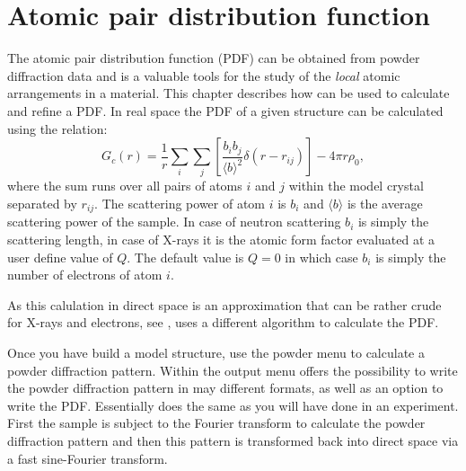 
\chapter{Atomic pair distribution function \label{pdf}}

The atomic pair distribution function (PDF) can be obtained from
powder diffraction data and is a valuable tools for the study of the
{\it local} atomic arrangements in a material. This chapter
describes how \Discus can be used to calculate and refine a
PDF. 
In real space the PDF of a given
structure can be calculated using the relation:
%
\begin{equation}
  G_{c}(r) = \frac{1}{r} \sum_{i}\sum_{j} \left [
             \frac{b_{i}b_{j}}{\langle b \rangle ^{2}}
             \delta (r - r_{ij}) \right ]   - 4 \pi r \rho_{0},
  \label{eq_igr}
\end{equation}
%
where the sum runs over all pairs of atoms $i$ and $j$ within the
model crystal separated by $r_{ij}$. The scattering power of atom
$i$ is $b_{i}$ and $\langle b \rangle$ is the average scattering
power of the sample. In case of neutron scattering $b_{i}$ is simply
the scattering length, in case of X-rays it is the atomic form
factor evaluated at a user define value of $Q$. The default value is
$Q=0$ in which case $b_{i}$ is simply the number of electrons of
atom $i$. 

As this calulation in direct space is an approximation that can be rather crude 
for X-rays and electrons,
see \cite{nepr2021}, \Discus uses a different algorithm to calculate the 
PDF. 

Once you have build a model structure, use the powder menu to calculate
a powder diffraction pattern. Within the output menu \Discus offers the 
possibility to write the powder diffraction pattern in may different
formats, as well as an option to write the PDF. Essentially \Discus
does the same as you will have done in an experiment. First the sample
is  subject to the Fourier transform to calculate the powder diffraction 
pattern and then this pattern is transformed back into direct space 
via a fast sine-Fourier transform.






